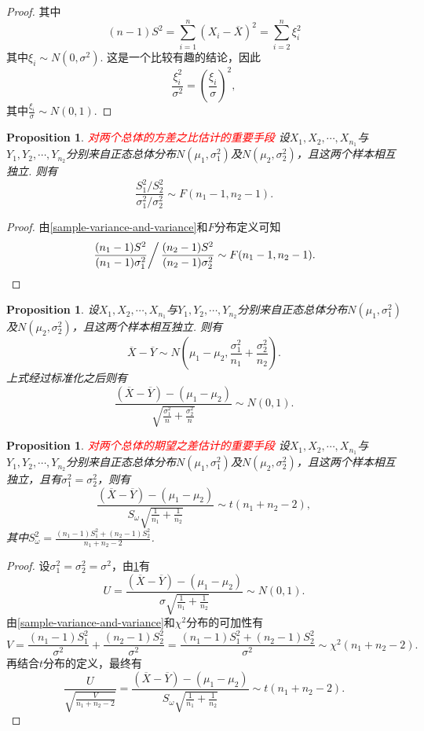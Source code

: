 \documentclass{article}
\newtheorem{proposition}[theorem]{Proposition}
\newcommand{\redt}[1]{\textcolor{red}{#1}}
\begin{document}
\begin{proof}
\rm 其中
$$
(n-1)S^2 = \sum\limits_{i=1}^n (X_i-\overline{X})^2 = \sum\limits_{i=2}^n \xi_i^2 
$$
其中$\xi_i \sim N(0,\sigma^2)$. 这是一个比较有趣的结论，因此
$$
\frac{\xi_i^2}{\sigma^2} = \left(\frac{\xi_i}{\sigma}\right)^2,
$$
其中$\frac{\xi_i}{\sigma} \sim N(0,1)$. 
\end{proof}

\begin{proposition}
\rm \redt{对两个总体的方差之比估计的重要手段} 设$X_1,X_2,\cdots,X_{n_1}$与$Y_1,Y_2,\cdots,Y_{n_2}$分别来自正态总体分布$N(\mu_1,\sigma_1^2)$及$N(\mu_2,\sigma_2^2)$，且这两个样本相互独立. 则有
$$
\frac{S_1^2/S_2^2}{\sigma_1^2 / \sigma_2^2} \sim F(n_1 -1,n_2 -1). 
$$
\end{proposition}

\begin{proof}
由\ref{sample-variance-and-variance}和$F$分布定义可知
$$
\left. \frac{(n_1-1)S^2}{(n_1-1)\sigma_1^2} \right / \frac{(n_2-1)S^2}{(n_2-1)\sigma_2^2} \sim F(n_1-1,n_2-1).
$$
\end{proof}

\begin{proposition}\label{two-sample-mean-difference}
\rm 设$X_1,X_2,\cdots,X_{n_1}$与$Y_1,Y_2,\cdots,Y_{n_2}$分别来自正态总体分布$N(\mu_1,\sigma_1^2)$及$N(\mu_2,\sigma_2^2)$，且这两个样本相互独立. 则有
$$
\overline{X} - \overline{Y} \sim N(\mu_1 -\mu_2, \frac{\sigma_1^2}{n_1} + \frac{\sigma_2^2}{n_2}).
$$
上式经过标准化之后则有
$$
\frac{(\overline{X} - \overline{Y})-(\mu_1-\mu_2)}{\sqrt{\frac{\sigma_1^2}{n} + \frac{\sigma_2^2}{n}}} \sim N(0,1).
$$
\end{proposition}

\begin{proposition}
\rm \redt{对两个总体的期望之差估计的重要手段} 设$X_1,X_2,\cdots,X_{n_1}$与$Y_1,Y_2,\cdots,Y_{n_2}$分别来自正态总体分布$N(\mu_1,\sigma_1^2)$及$N(\mu_2,\sigma_2^2)$，且这两个样本相互独立，且有$\sigma_1^2 = \sigma_2^2$，则有
$$
\frac{(\overline{X} - \overline{Y})-(\mu_1-\mu_2)}{S_\omega\sqrt{\frac{1}{n_1} + \frac{1}{n_2}}}\sim t(n_1+n_2-2),
$$
其中$S_\omega^2 = \frac{(n_1-1)S_1^2+(n_2-1)S_2^2}{n_1+n_2-2}$. 
\end{proposition}

\begin{proof}
设$\sigma_1^2 = \sigma_2^2 = \sigma^2$，由\ref{two-sample-mean-difference}有
$$
U = \frac{(\overline{X} - \overline{Y})-(\mu_1-\mu_2)}{\sigma\sqrt{\frac{1}{n_1} + \frac{1}{n_2}}} \sim N(0,1).
$$
由\ref{sample-variance-and-variance}和$\chi^2$分布的可加性有
$$
V = \frac{(n_1-1)S_1^2}{\sigma^2} + \frac{(n_2-1)S_2^2}{\sigma^2} = \frac{(n_1-1)S_1^2+(n_2-1)S_2^2}{\sigma^2} \sim \chi^2(n_1+n_2-2).   
$$
再结合$t$分布的定义，最终有
$$
\frac{U}{\sqrt{\frac{V}{n_1+n_2-2}}} = \frac{(\overline{X} - \overline{Y})-(\mu_1-\mu_2)}{S_\omega\sqrt{\frac{1}{n_1} + \frac{1}{n_2}}} \sim t(n_1+n_2-2). 
$$
\end{proof}
\end{document}
